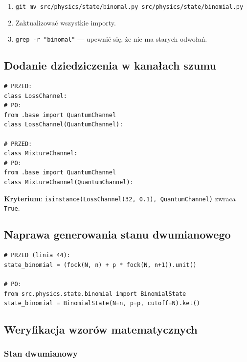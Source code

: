 \documentclass[12pt,a4paper]{article}
\begin{document}
\begin{enumerate}
    \item \texttt{git mv src/physics/state/binomal.py src/physics/state/binomial.py}
    \item Zaktualizować wszystkie importy.
    \item \texttt{grep -r "binomal"} --- upewnić się, że nie ma starych odwołań.
\end{enumerate}

\subsection{Dodanie dziedziczenia w kanałach szumu}

\begin{lstlisting}[caption={Naprawa dziedziczenia w \texttt{noise/loss.py} i \texttt{noise/mixture.py}.}, label={lst:fix-inheritance}]
# PRZED:
class LossChannel:
# PO:
from .base import QuantumChannel
class LossChannel(QuantumChannel):

# PRZED:
class MixtureChannel:
# PO:
from .base import QuantumChannel
class MixtureChannel(QuantumChannel):
\end{lstlisting}

\textbf{Kryterium}: \texttt{isinstance(LossChannel(32, 0.1), QuantumChannel)} zwraca \texttt{True}.

\subsection{Naprawa generowania stanu dwumianowego}

\begin{lstlisting}[caption={Naprawa błędu B2 w \texttt{generate.py}.}, label={lst:fix-binomial}]
# PRZED (linia 44):
state_binomial = (fock(N, n) + p * fock(N, n+1)).unit()

# PO:
from src.physics.state.binomial import BinomialState
state_binomial = BinomialState(N=n, p=p, cutoff=N).ket()
\end{lstlisting}

\subsection{Weryfikacja wzorów matematycznych}

\subsubsection{Stan dwumianowy}
\end{document}
